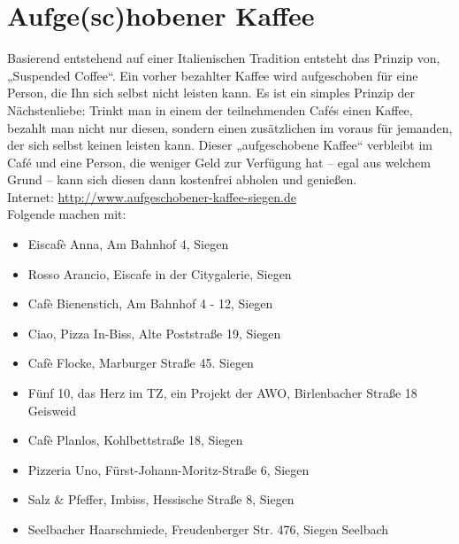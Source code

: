 \section{Aufge(sc)hobener Kaffee}

Basierend entstehend auf einer Italienischen Tradition entsteht das Prinzip von, „Suspended Coffee“.  Ein vorher bezahlter Kaffee wird aufgeschoben für eine Person, die Ihn sich selbst nicht leisten kann. Es ist ein simples Prinzip der Nächstenliebe: Trinkt man in einem der teilnehmenden Cafés einen Kaffee, bezahlt man nicht nur diesen, sondern einen zusätzlichen im voraus für jemanden, der sich selbst keinen leisten kann. Dieser „aufgeschobene Kaffee“ verbleibt im Café und eine Person, die weniger Geld zur Verfügung hat – egal aus welchem Grund – kann sich diesen dann kostenfrei abholen und genießen.\\
Internet: \href{http://www.aufgeschobener-kaffee-siegen.de}{http://www.aufgeschobener-kaffee-siegen.de}\\
Folgende machen mit:\\
\begin{itemize}
	\item Eiscafè Anna, Am Bahnhof 4, Siegen  
	\item Rosso Arancio, Eiscafe in der Citygalerie, Siegen
	\item Cafè Bienenstich, Am Bahnhof 4 - 12, Siegen
	\item Ciao, Pizza In-Biss, Alte Poststraße 19, Siegen
	\item Cafè Flocke, Marburger Straße 45. Siegen  
	\item Fünf 10, das Herz im TZ, ein Projekt der AWO, Birlenbacher Straße 18 Geisweid
	\item Cafè Planlos, Kohlbettstraße 18, Siegen  
	\item Pizzeria Uno, Fürst-Johann-Moritz-Straße 6, Siegen 
	\item Salz \& Pfeffer, Imbiss, Hessische Straße 8, Siegen
	\item Seelbacher Haarschmiede, Freudenberger Str. 476, Siegen Seelbach 
\end{itemize}